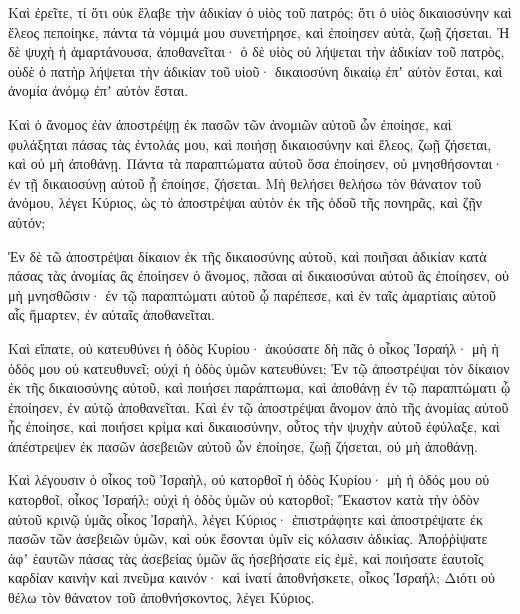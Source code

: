 {\par }{\PP {}Καὶ ἐρεῖτε, τί ὅτι οὐκ ἔλαβε τὴν ἀδικίαν ὁ υἱὸς τοῦ πατρός; ὅτι ὁ υἱὸς δικαιοσύνην καὶ ἔλεος πεποίηκε, πάντα τὰ νόμιμά μου συνετήρησε, καὶ ἐποίησεν αὐτὰ, ζωῇ ζήσεται.
Ἡ δὲ ψυχὴ ἡ ἁμαρτάνουσα, ἀποθανεῖται· ὁ δὲ υἱὸς οὐ λήψεται τὴν ἀδικίαν τοῦ πατρὸς, οὐδὲ ὁ πατὴρ λήψεται τὴν ἀδικίαν τοῦ υἱοῦ· δικαιοσύνη δικαίῳ ἐπʼ αὐτὸν ἔσται, καὶ ἀνομία ἀνόμῳ ἐπʼ αὐτὸν ἔσται.
\par }{\PP {}Καὶ ὁ ἄνομος ἐὰν ἀποστρέψῃ ἐκ πασῶν τῶν ἀνομιῶν αὐτοῦ ὧν ἐποίησε, καὶ φυλάξηται πάσας τὰς ἐντολάς μου, καὶ ποιήσῃ δικαιοσύνην καὶ ἔλεος, ζωῇ ζήσεται, καὶ οὐ μὴ ἀποθάνῃ.
Πάντα τὰ παραπτώματα αὐτοῦ ὅσα ἐποίησεν, οὐ μνησθήσονται· ἐν τῇ δικαιοσύνῃ αὐτοῦ ᾗ ἐποίησε, ζήσεται.
Μὴ θελήσει θελήσω τὸν θάνατον τοῦ ἀνόμου, λέγει Κύριος, ὡς τὸ ἀποστρέψαι αὐτὸν ἐκ τῆς ὁδοῦ τῆς πονηρᾶς, καὶ ζῇν αὐτόν;
\par }{\PP {}Ἐν δὲ τῶ ἀποστρέψαι δίκαιον ἐκ τῆς δικαιοσύνης αὐτοῦ, καὶ ποιῆσαι ἀδικίαν κατὰ πάσας τὰς ἀνομίας ἃς ἐποίησεν ὁ ἄνομος, πᾶσαι αἱ δικαιοσύναι αὐτοῦ ἃς ἐποίησεν, οὐ μὴ μνησθῶσιν· ἐν τῷ παραπτώματι αὐτοῦ ᾧ παρέπεσε, καὶ ἐν ταῖς ἁμαρτίαις αὐτοῦ αἷς ἥμαρτεν, ἐν αὐταῖς ἀποθανεῖται.
\par }{\PP {}Καὶ εἴπατε, οὐ κατευθύνει ἡ ὁδὸς Κυρίου· ἀκούσατε δὴ πᾶς ὁ οἶκος Ἰσραήλ· μὴ ἡ ὁδός μου οὐ κατευθυνεῖ; οὐχὶ ἡ ὁδὸς ὑμῶν κατευθύνει;
Ἐν τῷ ἀποστρέψαι τὸν δίκαιον ἐκ τῆς δικαιοσύνης αὐτοῦ, καὶ ποιήσει παράπτωμα, καὶ ἀποθάνῃ ἐν τῷ παραπτώματι ᾧ ἐποίησεν, ἐν αὐτῷ ἀποθανεῖται.
Καὶ ἐν τῷ ἀποστρέψαι ἄνομον ἀπὸ τῆς ἀνομίας αὐτοῦ ἧς ἐποίησε, καὶ ποιήσει κρίμα καὶ δικαιοσύνην, οὗτος τὴν ψυχὴν αὐτοῦ ἐφύλαξε,
καὶ ἀπέστρεψεν ἐκ πασῶν ἀσεβειῶν αὐτοῦ ὧν ἐποίησε, ζωῇ ζήσεται, οὐ μὴ ἀποθάνῃ.
\par }{\PP {}Καὶ λέγουσιν ὁ οἶκος τοῦ Ἰσραὴλ, οὐ κατορθοῖ ἡ ὁδὸς Κυρίου· μὴ ἡ ὁδός μου οὐ κατορθοῖ, οἶκος Ἰσραήλ; οὐχὶ ἡ ὁδὸς ὑμῶν οὐ κατορθοῖ;
Ἕκαστον κατὰ τὴν ὁδὸν αὐτοῦ κρινῷ ὑμᾶς οἶκος Ἰσραὴλ, λέγει Κύριος· ἐπιστράφητε καὶ ἀποστρέψατε ἐκ πασῶν τῶν ἀσεβειῶν ὑμῶν, καὶ οὐκ ἔσονται ὑμῖν εἰς κόλασιν ἀδικίας.
Ἀποῤῥίψατε ἀφʼ ἑαυτῶν πάσας τὰς ἀσεβείας ὑμῶν ἃς ἠσεβήσατε εἰς ἐμὲ, καὶ ποιήσατε ἑαυτοῖς καρδίαν καινὴν καὶ πνεῦμα καινόν· καὶ ἱνατί ἀποθνήσκετε, οἶκος Ἰσραήλ;
Διότι οὐ θέλω τὸν θάνατον τοῦ ἀποθνήσκοντος, λέγει Κύριος.

}
